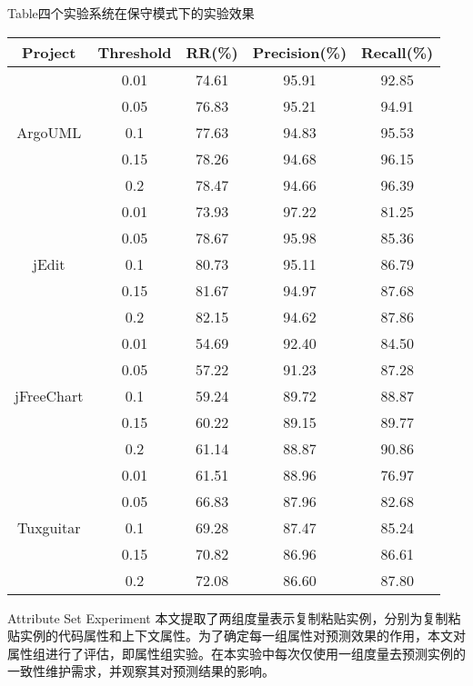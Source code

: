 \begin{table}[htbp]
{Table$\!$}{四个实验系统在保守模式下的实验效果}
\vspace{0.5em}
\centering
\wuhao
\begin{tabular}{ccccc}
\toprule[1.5pt]
\textbf{Project}&\textbf{Threshold}&\textbf{RR(\%)}&\textbf{Precision(\%)}&\textbf{Recall(\%)}\\
\midrule[1pt]
\multirow{5}{*}{ArgoUML}
&0.01&	74.61&	95.91&	92.85\\
&0.05&	76.83&	95.21&	94.91\\
&0.1&	77.63&	94.83&	95.53\\
&0.15&  78.26&	94.68&	96.15\\
&0.2&	78.47&	94.66&	96.39\\
\multirow{5}{*}{jEdit}
&0.01&	73.93&	97.22&	81.25\\
&0.05&	78.67&	95.98&	85.36	\\
&0.1&	80.73&	95.11&	86.79	\\
&0.15&	81.67&	94.97&	87.68	\\
&0.2&	82.15&	94.62&	87.86	\\
\multirow{5}{*}{jFreeChart}
&0.01&	54.69&	92.40&	84.50\\
&0.05&	57.22&	91.23&	87.28\\
&0.1&	59.24&	89.72&	88.87\\
&0.15&	60.22&	89.15&	89.77\\
&0.2&	61.14&	88.87&	90.86\\
\multirow{5}{*}{Tuxguitar}
&0.01&	61.51&	88.96&	76.97\\
&0.05&	66.83&	87.96&	82.68\\
&0.1&	69.28&	87.47&	85.24\\
&0.15&	70.82&	86.96&	86.61\\
&0.2&	72.08&	86.60&	87.80\\
\bottomrule[1.5pt]
\end{tabular}
\end{table}

{Attribute Set Experiment}
本文提取了两组度量表示复制粘贴实例，分别为复制粘贴实例的代码属性和上下文属性。为了确定每一组属性对预测效果的作用，本文对属性组进行了评估，即属性组实验。在本实验中每次仅使用一组度量去预测实例的一致性维护需求，并观察其对预测结果的影响。

